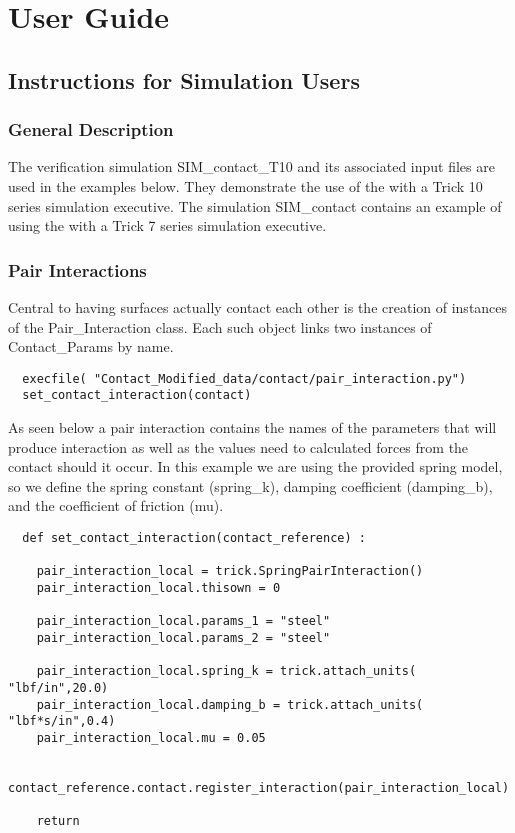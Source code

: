 %
%
%  
%

\chapter{User Guide}\label{ch:user}

\section{Instructions for Simulation Users}
\subsection{General Description}
The verification simulation SIM\_contact\_T10 and its associated input files are used in the examples below.  They demonstrate the use of the \ModelDesc with a Trick 10 series simulation executive.  The simulation SIM\_contact contains an example of using the \ModelDesc with a Trick 7 series simulation executive.

\subsection{Pair Interactions}
Central to having surfaces actually contact each other is the creation of instances of the Pair\_Interaction class.  Each such object links two instances of Contact\_Params by name.
\begin{verbatim}
  execfile( "Contact_Modified_data/contact/pair_interaction.py")
  set_contact_interaction(contact)
\end{verbatim}

As seen below a pair interaction contains the names of the parameters that will produce interaction as well as the values need to calculated forces from the contact should it occur.  In this example we are using the \ModelDesc provided spring model, so we define the spring constant (spring\_k), damping coefficient (damping\_b), and the coefficient of friction (mu).
\begin{verbatim}
  def set_contact_interaction(contact_reference) :

    pair_interaction_local = trick.SpringPairInteraction()
    pair_interaction_local.thisown = 0

    pair_interaction_local.params_1 = "steel"
    pair_interaction_local.params_2 = "steel"

    pair_interaction_local.spring_k = trick.attach_units( "lbf/in",20.0)
    pair_interaction_local.damping_b = trick.attach_units( "lbf*s/in",0.4)
    pair_interaction_local.mu = 0.05

    contact_reference.contact.register_interaction(pair_interaction_local)

    return
\end{verbatim}

